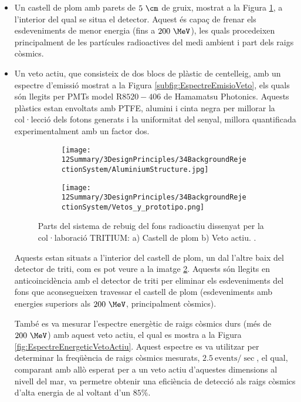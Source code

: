 \begin{itemize}

\item{} Un castell de plom amb parets de $5~\cm$ de gruix, mostrat a la Figura \ref{subfig:CastellPlom}, a l'interior del qual se situa el detector. Aquest és capaç de frenar els esdeveniments de menor energia (fins a $200~\MeV$), les quals procedeixen principalment de les partícules radioactives del medi ambient i part dels raigs còsmics.

\item{} Un veto actiu, que consisteix de dos blocs de plàstic de centelleig, amb un espectre d'emissió mostrat a la Figura \ref{subfig:EspectreEmisioVeto}, els quals són llegits per PMTs model R$8520-406$ de Hamamatsu Photonics. Aquests plàstics estan envoltats amb PTFE, alumini i cinta negra per millorar la col·lecció dels fotons generats i la uniformitat del senyal, millora quantificada experimentalment amb un factor dos.

\begin{figure}
\centering
    \begin{subfigure}[b]{0.7\textwidth}
    \centering
    \texttt{[image: 12Summary/3DesignPrinciples/34BackgroundRejectionSystem/AluminiumStructure.jpg]}  
        \caption{}\label{subfig:CastellPlom}
    \end{subfigure}
    \hfill
    \begin{subfigure}[b]{0.7\textwidth}
    \centering
    \texttt{[image: 12Summary/3DesignPrinciples/34BackgroundRejectionSystem/Vetos\_y\_prototipo.png]}  
    \caption{\label{subfig:VetoActiu}}
    \end{subfigure}
\caption{Parts del sistema de rebuig del fons radioactiu dissenyat per la col·laboració TRITIUM: a) Castell de plom b) Veto actiu. \label{fig:SistemaRebuigFonsRadioactiu}.}
\end{figure}

Aquests estan situats a l'interior del castell de plom, un dal l'altre baix del detector de triti, com es pot veure a la imatge \ref{subfig:VetoActiu}. Aquests són llegits en anticoincidència amb el detector de triti per eliminar els esdeveniments del fons que aconsegueixen travessar el castell de plom (esdeveniments amb energies superiors als $200~\MeV$, principalment còsmics). 

També es va mesurar l'espectre energètic de raigs còsmics durs (més de $200~\MeV$) amb aquest veto actiu, el qual es mostra a la Figura \ref{fig:EspectreEnergeticVetoActiu}. Aquest espectre es va utilitzar per determinar la freqüència de raigs còsmics mesurats, $2.5~\text{events}/\sec$, el qual, comparant amb allò esperat per a un veto actiu d'aquestes dimensions al nivell del mar, va permetre obtenir una eficiència de detecció als raigs còsmics d'alta energia de al voltant d'un $85\%$.


\end{itemize}
